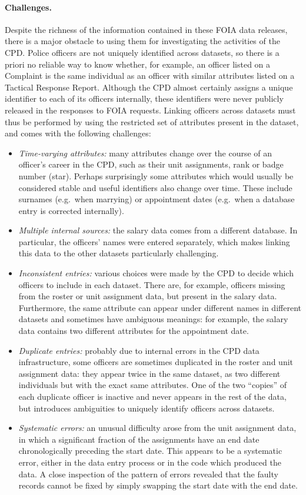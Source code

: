 \paragraph{Challenges.}
Despite the richness of the information contained in these FOIA data releases,
there is a major obstacle to using them for investigating the activities of the
CPD. Police officers are not uniquely identified across datasets, so there is
a priori no reliable way to know whether, for example, an officer listed on
a Complaint is the same individual as an officer with similar attributes listed
on a Tactical Response Report. Although the CPD almost certainly assigns
a unique identifier to each of its officers internally, these identifiers were
never publicly released in the responses to FOIA requests. Linking officers
across datasets must thus be performed by using the restricted set of
attributes present in the dataset, and comes with the following challenges:
\begin{itemize}
	\item \emph{Time-varying attributes:} many attributes change over the
		course of an officer's career in the CPD, such as their unit
		assignments, rank or badge number (star). Perhaps surprisingly some
		attributes which would usually be considered stable and useful
		identifiers also change over time. These include surnames (e.g.\ when
		marrying) or appointment dates (e.g.\ when a database entry is
		corrected internally).
	\item \emph{Multiple internal sources:} the salary data comes from
		a different database. In particular, the officers' names were entered
		separately, which makes linking this data to the other datasets
		particularly challenging.
	\item \emph{Inconsistent entries:} various choices were made by the CPD to
		decide which officers to include in each dataset.  There are, for
		example, officers missing from the roster or unit assignment data, but
		present in the salary data. Furthermore, the same attribute can appear
		under different names in different datasets and sometimes have
		ambiguous meanings: for example, the salary data contains two different
		attributes for the appointment date.
	\item \emph{Duplicate entries:} probably due to internal errors in the CPD
		data infrastructure, some officers are sometimes duplicated in the
		roster and unit assignment data: they appear twice in the same dataset,
		as two different individuals but with the exact same attributes. One of
		the two “copies” of each duplicate officer is inactive and never
		appears in the rest of the data, but introduces ambiguities to uniquely
		identify officers across datasets.
	\item \emph{Systematic errors:} an unusual difficulty arose from the unit
		assignment data, in which a significant fraction of the assignments
		have an end date chronologically preceding the start date. This appears
		to be a systematic error, either in the data entry process or in the
		code which produced the data. A close inspection of the pattern of
		errors revealed that the faulty records cannot be fixed by simply
		swapping the start date with the end date.
\end{itemize}

